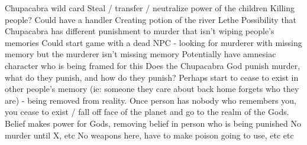 \documentclass[blue]{GL2020}
\begin{document}
Chupacabra wild card
Steal / transfer / neutralize power of the children
Killing people?  Could have a handler
Creating potion of the river Lethe
Possibility that Chupacabra has different punishment to murder that isn’t wiping people’s memories
Could start game with a dead NPC - looking for murderer with missing memory but the murderer isn’t missing memory
Potentially have amnesiac character who is being framed for this
Does the Chupacabra God punish murder, what do they punish, and how do they punish?
Perhaps start to cease to exist in other people’s memory (ie: someone they care about back home forgets who they are) - being removed from reality.  Once person has nobody who remembers you, you cease to exist / fall off face of the planet and go to the realm of the Gods.
Belief makes power for Gods, removing belief in person who is being punished
No murder until X, etc
No weapons here, have to make poison going to use, etc etc
\end{document}
